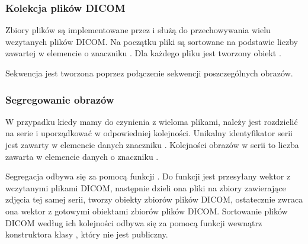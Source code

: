 \subsubsection{Kolekcja plików DICOM}
\label{sec:sokar-dicomfileset}
\par
Zbiory plików są implementowane przez  i służą do przechowywania wielu wczytanych plików DICOM.
Na początku pliki są sortowane na podstawie liczby zawartej w elemencie o znaczniku .
Dla każdego pliku jest tworzony obiekt .
\par
Sekwencja jest tworzona poprzez połączenie sekwencji poszczególnych obrazów.

\subsubsection{Segregowanie obrazów}
\label{sec:sokar-dicomfileset-create}
\par
W przypadku kiedy mamy do czynienia z wieloma plikami, należy jest rozdzielić na serie i uporządkować w odpowiedniej kolejności.
Unikalny identyfikator serii jest zawarty w elemencie danych znaczniku .
Kolejności obrazów w serii to liczba zawarta w elemencie danych o znaczniku .
\par
Segregacja odbywa się za pomocą funkcji .
Do funkcji jest przesyłany wektor z wczytanymi plikami DICOM, następnie dzieli ona pliki na zbiory zawierające zdjęcia tej samej serii, tworzy obiekty zbiorów plików DICOM, ostatecznie zwraca ona wektor z gotowymi obiektami zbiorów plików DICOM.
Sortowanie plików DICOM według ich kolejności odbywa się za pomocą funkcji  wewnątrz konstruktora klasy , który nie jest publiczny.